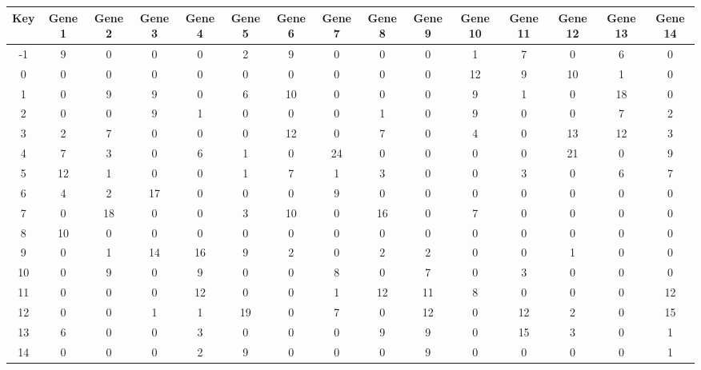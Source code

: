 \begin{tabular}{|c|c|c|c|c|c|c|c|c|c|c|c|c|c|c|}
\hline
Key & Gene 1 & Gene 2 & Gene 3 & Gene 4 & Gene 5 & Gene 6 & Gene 7 & Gene 8 & Gene 9 & Gene 10 & Gene 11 & Gene 12 & Gene 13 & Gene 14 \\
\hline
-1 & 9 & 0 & 0 & 0 & 2 & 9 & 0 & 0 & 0 & 1 & 7 & 0 & 6 & 0 \\
0 & 0 & 0 & 0 & 0 & 0 & 0 & 0 & 0 & 0 & 12 & 9 & 10 & 1 & 0 \\
1 & 0 & 9 & 9 & 0 & 6 & 10 & 0 & 0 & 0 & 9 & 1 & 0 & 18 & 0 \\
2 & 0 & 0 & 9 & 1 & 0 & 0 & 0 & 1 & 0 & 9 & 0 & 0 & 7 & 2 \\
3 & 2 & 7 & 0 & 0 & 0 & 12 & 0 & 7 & 0 & 4 & 0 & 13 & 12 & 3 \\
4 & 7 & 3 & 0 & 6 & 1 & 0 & 24 & 0 & 0 & 0 & 0 & 21 & 0 & 9 \\
5 & 12 & 1 & 0 & 0 & 1 & 7 & 1 & 3 & 0 & 0 & 3 & 0 & 6 & 7 \\
6 & 4 & 2 & 17 & 0 & 0 & 0 & 9 & 0 & 0 & 0 & 0 & 0 & 0 & 0 \\
7 & 0 & 18 & 0 & 0 & 3 & 10 & 0 & 16 & 0 & 7 & 0 & 0 & 0 & 0 \\
8 & 10 & 0 & 0 & 0 & 0 & 0 & 0 & 0 & 0 & 0 & 0 & 0 & 0 & 0 \\
9 & 0 & 1 & 14 & 16 & 9 & 2 & 0 & 2 & 2 & 0 & 0 & 1 & 0 & 0 \\
10 & 0 & 9 & 0 & 9 & 0 & 0 & 8 & 0 & 7 & 0 & 3 & 0 & 0 & 0 \\
11 & 0 & 0 & 0 & 12 & 0 & 0 & 1 & 12 & 11 & 8 & 0 & 0 & 0 & 12 \\
12 & 0 & 0 & 1 & 1 & 19 & 0 & 7 & 0 & 12 & 0 & 12 & 2 & 0 & 15 \\
13 & 6 & 0 & 0 & 3 & 0 & 0 & 0 & 9 & 9 & 0 & 15 & 3 & 0 & 1 \\
14 & 0 & 0 & 0 & 2 & 9 & 0 & 0 & 0 & 9 & 0 & 0 & 0 & 0 & 1 \\
\hline
\end{tabular}